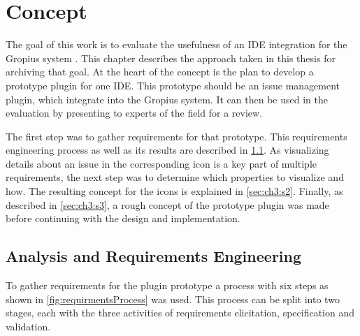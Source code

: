 
\chapter{Concept}
\label{chap:ch3}
The goal of this work is to evaluate the usefulness of an \gls{IDE} integration for the Gropius system \cite{speth2020gropius}.
This chapter describes the approach taken in this thesis for archiving that goal.
At the heart of the concept is the plan to develop a prototype plugin for one \gls{IDE}.
This prototype should be an issue management plugin, which integrate into the Gropius system.
It can then be used in the evaluation by presenting to experts of the field for a review.

The first step was to gather requirements for that prototype. 
This requirements engineering process as well as its results are described in \cref{sec:ch3:s1}.
As visualizing details about an issue in the corresponding icon is a key part of multiple requirements,
the next step was to determine which properties to visualize and how.
The resulting concept for the icons is explained in \cref{sec:ch3:s2}.
Finally, as described in \cref{sec:ch3:s3}, 
a rough concept of the prototype plugin was made before continuing with the design and implementation.

\section{Analysis and Requirements Engineering}
\label{sec:ch3:s1}
To gather requirements for the plugin prototype a process with six steps as shown in \cref{fig:requirmentsProcess} was used.
This process can be split into two stages, each with the three activities of requirements elicitation, specification and validation.

